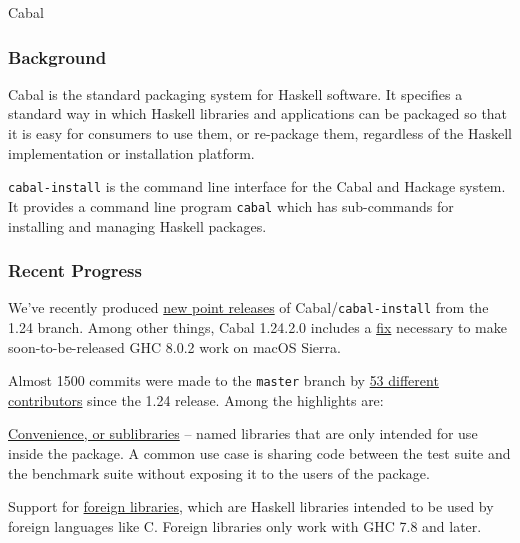 \begin{hcarentry}{Cabal}
\label{cabal}%
\makeheader

\subsubsection*{Background}

Cabal is the standard packaging system for Haskell software. It specifies a
standard way in which Haskell libraries and applications can be packaged so
that it is easy for consumers to use them, or re-package them, regardless of
the Haskell implementation or installation platform.

\texttt{cabal-install} is the command line interface for the Cabal and Hackage
system. It provides a command line program \texttt{cabal} which has
sub-commands for installing and managing Haskell packages.

\subsubsection*{Recent Progress}

We've recently produced
\href{https://mail.haskell.org/pipermail/cabal-devel/2016-December/010384.html}{new
  point releases} of Cabal/\texttt{cabal-install} from the 1.24
branch. Among other things, Cabal 1.24.2.0 includes a
\href{https://gitlab.haskell.org/ghc/ghc/-/issues/12479}{fix} necessary to
make soon-to-be-released GHC 8.0.2 work on macOS Sierra.

Almost 1500 commits were made to the \texttt{master} branch by
\href{https://gist.github.com/23Skidoo/1a291fd56a18b51f415db5fbaff56ec6}{53
different contributors} since the 1.24 release. Among the highlights are:

\begin{compactitem}
\item
  \href{http://cabal.readthedocs.io/en/latest/developing-packages.html#library}{Convenience,
    or sublibraries} -- named libraries that are only intended
  for use inside the package. A common use case is sharing code
  between the test suite and the benchmark suite without exposing it
  to the users of the package.

\item Support for
  \href{http://cabal.readthedocs.io/en/latest/developing-packages.html#foreign-libraries}{foreign
    libraries}, which are Haskell libraries intended to be used by
  foreign languages like C.  Foreign libraries only work with GHC 7.8
  and later.


\end{compactitem}
\end{hcarentry}
